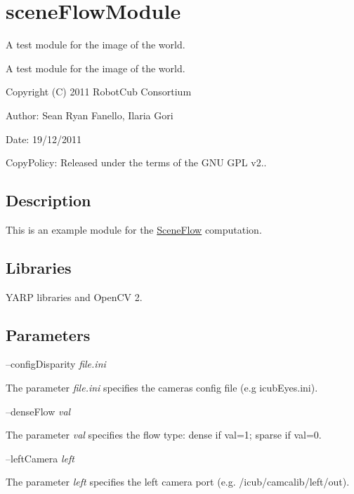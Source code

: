 \section{scene\+Flow\+Module}
\label{group__sceneFlowModule}


A test module for the image of the world.  


A test module for the image of the world. 

Copyright (C) 2011 Robot\+Cub Consortium

Author\+: Sean Ryan Fanello, Ilaria Gori

Date\+: 19/12/2011

Copy\+Policy\+: Released under the terms of the G\+N\+U G\+P\+L v2..\hypertarget{group__SFM_intro_sec}{}\subsection{Description}\label{group__SFM_intro_sec}
This is an example module for the \hyperlink{classSceneFlow}{Scene\+Flow} computation.\hypertarget{group__SFM_lib_sec}{}\subsection{Libraries}\label{group__SFM_lib_sec}
Y\+A\+R\+P libraries and Open\+C\+V 2.\hypertarget{group__SFM_parameters_sec}{}\subsection{Parameters}\label{group__SFM_parameters_sec}
--config\+Disparity {\itshape file.\+ini} 
\begin{DoxyItemize}
\item The parameter {\itshape file.\+ini} specifies the cameras config file (e.\+g icub\+Eyes.\+ini).
\end{DoxyItemize}

--dense\+Flow {\itshape val} 
\begin{DoxyItemize}
\item The parameter {\itshape val} specifies the flow type\+: dense if val=1; sparse if val=0.
\end{DoxyItemize}

--left\+Camera {\itshape left} 
\begin{DoxyItemize}
\item The parameter {\itshape left} specifies the left camera port (e.\+g. /icub/camcalib/left/out).
\end{DoxyItemize}

